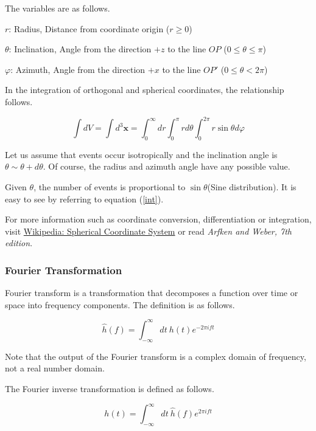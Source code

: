 The variables are as follows.

$r$: Radius, Distance from coordinate origin ($r \geq 0$)

$\theta$: Inclination, Angle from the direction $+z$ to the line $OP$ ($0 \leq \theta \leq \pi$)

$\varphi$: Azimuth, Angle from the direction $+x$ to the line $OP'$ ($0 \leq \theta < 2\pi$)

In the integration of orthogonal and spherical coordinates, the relationship follows.

\begin{equation}\label{int}
    \int dV = \int d^3 \mathbf{x} = \int_0^\infty dr \int_0^\pi r d\theta \int_0^{2\pi} r \sin{\theta} d\varphi
\end{equation}

Let us assume that events occur isotropically and the inclination angle is $\theta \sim \theta + d \theta$. Of course, the radius and azimuth angle have any possible value.

Given $\theta$, the number of events is proportional to $\sin{\theta}$(Sine distribution). It is easy to see by referring to equation (\ref{int}).

For more information such as coordinate conversion, differentiation or integration, visit \href{https://en.wikipedia.org/wiki/Spherical_coordinate_system}{Wikipedia: Spherical Coordinate System} or read \textit{Arfken and Weber, 7th edition}.

\subsubsection{Fourier Transformation}

Fourier transform is a transformation that decomposes a function over time or space into frequency components. The definition is as follows.

\begin{equation}
    \hat{h}(f) = \int_{-\infty}^\infty dt \ h(t)e^{-2\pi i f t}
\end{equation}

Note that the output of the Fourier transform is a complex domain of frequency, not a real number domain.

The Fourier inverse transformation is defined as follows.

\begin{equation}
    h(t) = \int_{-\infty}^\infty dt \ \hat{h}(f)e^{2\pi i f t}
\end{equation}

